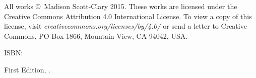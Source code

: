 \singlespacing
\thispagestyle{empty}
\null
\vfill
{\small\parindent0pt
\noindent All works \copyright\ Madison Scott-Clary 2015. These works are licensed under the Creative Commons Attribution 4.0 International License. To view a copy of this license, visit \mbox{\emph{creativecommons.org/licenses/by/4.0/}} or send a letter to Creative Commons, PO Box 1866, Mountain View, CA 94042, USA.

\vspace{1ex}

ISBN: \ISBN

\vspace{1ex}

\emph{\Title}

\vspace{1ex}

First Edition, \Year.

\EditionsList
}

\cleardoublepage
